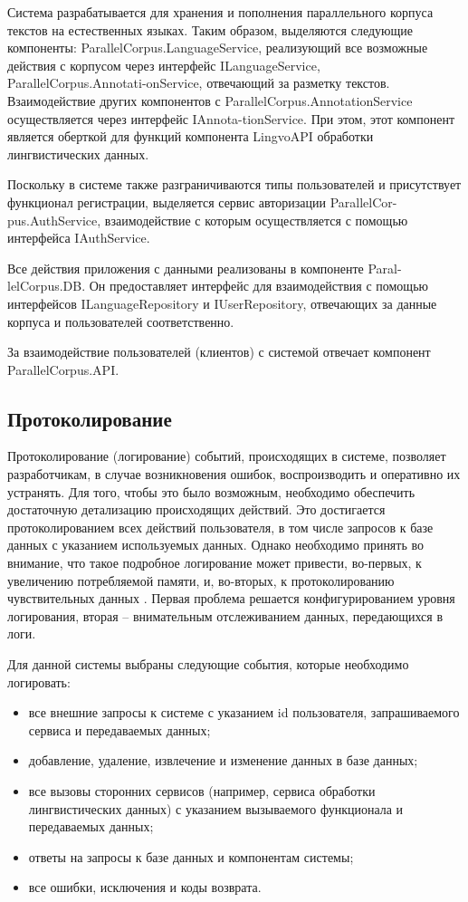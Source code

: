 Система разрабатывается для хранения и пополнения параллельного корпуса текстов на естественных языках. Таким образом, выделяются следующие компоненты: 
ParallelCorpus.LanguageService, реализующий все возможные действия с корпусом через интерфейс ILanguageService,
ParallelCorpus.Annotati-onService, отвечающий за разметку текстов. Взаимодействие других компонентов с ParallelCorpus.AnnotationService осуществляется через интерфейс IAnnota-tionService. При этом, этот компонент является оберткой для функций компонента LingvoAPI обработки лингвистических данных.

Поскольку в системе также разграничиваются типы пользователей и присутствует функционал регистрации, выделяется сервис авторизации ParallelCor-pus.AuthService, взаимодействие с которым осуществляется с помощью интерфейса IAuthService.

Все действия приложения с данными реализованы в компоненте Paral-lelCorpus.DB. Он предоставляет интерфейс для взаимодействия с помощью интерфейсов ILanguageRepository и IUserRepository, отвечающих за данные корпуса и пользователей соответственно.

За взаимодействие пользователей (клиентов) с системой отвечает компонент ParallelCorpus.API.

\subsection{Протоколирование}

Протоколирование (логирование) событий, происходящих в системе, позволяет разработчикам, в случае возникновения ошибок, воспроизводить и оперативно их устранять. 
Для того, чтобы это было возможным, необходимо обеспечить достаточную детализацию происходящих действий. 
Это достигается протоколированием всех действий пользователя, в том числе запросов к базе данных с указанием используемых данных. 
Однако необходимо принять во внимание, что такое подробное логирование может привести, во-первых, к увеличению потребляемой памяти, и, во-вторых, к протоколированию чувствительных данных \cite{wilkins-logging-2022}. 
Первая проблема решается конфигурированием уровня логирования, вторая -- внимательным отслеживанием данных, передающихся в логи. 

Для данной системы выбраны следующие события, которые необходимо логировать:

\begin{itemize}[label=---]
	\item все внешние запросы к системе с указанием id пользователя, запрашиваемого сервиса и передаваемых данных;
	\item добавление, удаление, извлечение и изменение данных в базе данных;
	\item все вызовы сторонних сервисов (например, сервиса обработки лингвистических данных) с указанием вызываемого функционала и передаваемых данных;
	\item ответы на запросы к базе данных и компонентам системы;
	\item все ошибки, исключения и коды возврата.
\end{itemize}

